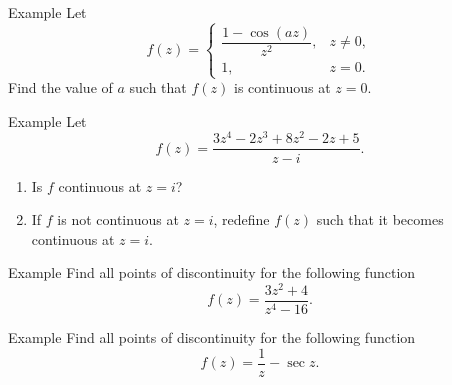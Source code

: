 \documentclass[11pt]{beamer}
\theoremstyle{plain}
\begin{document}
\begin{frame}{Example}
Let
\[
f(z)=
\begin{cases}
\dfrac{1-\cos(az)}{z^2}, & z\neq 0,\\[6pt]
1, & z=0.
\end{cases}
\]
Find the value of $a$ such that $f(z)$ is continuous at $z=0$.
\end{frame}

\begin{frame}{Example}
Let
\[
f(z)=\frac{3z^4-2z^3+8z^2-2z+5}{z-i}.
\]
\begin{enumerate}
  \item Is $f$ continuous at $z=i$?
  \item If $f$ is not continuous at $z=i$, redefine $f(z)$ such that it becomes
  continuous at $z=i$.
\end{enumerate}   
\end{frame}

\begin{frame}{Example}
Find all points of discontinuity for the following function
\[
f(z)=\frac{3z^2+4}{z^4-16}.
\]
\end{frame}

\begin{frame}{Example}
Find all points of discontinuity for the following function
\[
f(z)=\frac{1}{z}-\sec{z}.
\]
\end{frame}
\end{document}
